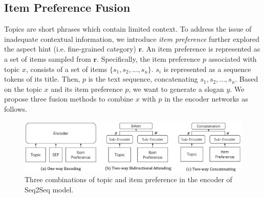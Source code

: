 \subsection{Item Preference Fusion}
\label{sec:preference}
Topics are short phrases which contain limited context.
To address the issue of inadequate contextual information, 
we introduce \emph{item preference} further explored 
the aspect hint (i.e. fine-grained category) $\mathbf{r}$.
An item preference is represented as a set of items sampled from 
$\mathbf{ r }$.
Specifically, the item preference $p$ associated with topic $x$,
consists of a set of items 
$\{s_1, s_2, ..., s_u\}$. 
$s_i$ is represented as a sequence tokens of its title.
Then, $p$ is the text sequence, concatenating $s_1, s_2, ..., s_u$. 
Based on the topic $x$ and its item preference $p$, we want to generate 
a slogan $y$.
We propose three fusion methods to combine $x$ with $p$ in the encoder networks as follows.

\begin{figure}[th!]
	\centering
	\includegraphics[width=1.7\columnwidth]{figures/enc}
	\caption{Three combinations of topic and item preference in the encoder of Seq2Seq model.}
	\label{fig:enc}
\end{figure}


